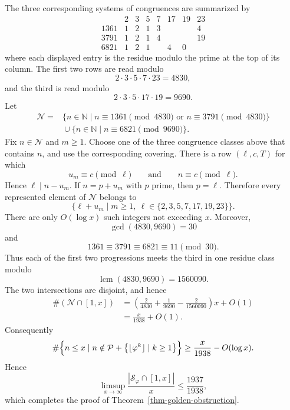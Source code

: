 \documentclass[11pt,reqno]{amsart}
\numberwithin{equation}{section}
\begin{document}
    The three corresponding systems of congruences are summarized by
    $$
    \begin{array}{c|ccccccc}
        & 2 & 3 & 5 & 7 & 17 & 19 & 23\\
        \hline
        1361 & 1 & 2 & 1 & 3 &   &   & 4\\
        3791 & 1 & 2 & 1 & 4 &   &   & 19\\
        6821 & 1 & 2 & 1 &   & 4 & 0 &
    \end{array}
    $$
    where each displayed entry is the residue modulo the prime at the top of its column. The first two rows are read modulo
    $$
    2\cdot3\cdot5\cdot7\cdot23=4830,
    $$
    and the third is read modulo
    $$
    2\cdot3\cdot5\cdot17\cdot19=9690.
    $$
    Let
    $$
    \begin{aligned}
        \mathcal{N}={}&\{n\in\mathbb{N}\mid n\equiv1361\pmod{4830}
        \text{ or }n\equiv3791\pmod{4830}\}\\
        &{}\cup\{n\in\mathbb{N}\mid n\equiv6821\pmod{9690}\}.
    \end{aligned}
    $$
    Fix $n\in\mathcal{N}$ and $m\ge1$. Choose one of the three congruence classes above that contains $n$, and use the corresponding covering. There is a row $(\ell,c,T)$ for which
    $$
    u_m\equiv c\pmod\ell
    \qquad\text{and}\qquad
    n\equiv c\pmod\ell.
    $$
    Hence $\ell\mid n-u_m$. If $n=p+u_m$ with $p$ prime, then $p=\ell$. Therefore every represented element of $\mathcal{N}$ belongs to
    $$
    \{\ell+u_m\mid m\ge1,\ \ell\in\{2,3,5,7,17,19,23\}\}.
    $$
    There are only $O(\log x)$ such integers not exceeding $x$. Moreover,
    $$
    \gcd(4830,9690)=30
    $$
    and
    $$
    1361\equiv3791\equiv6821\equiv11\pmod {30}.
    $$
    Thus each of the first two progressions meets the third in one residue class modulo
    $$
    \operatorname{lcm}(4830,9690)=1560090.
    $$
    The two intersections are disjoint, and hence
    $$
    \begin{aligned}
        \#(\mathcal{N}\cap[1,x])
        &=\left(\frac{2}{4830}+\frac{1}{9690}-\frac{2}{1560090}\right)x+O(1)\\
        &=\frac{x}{1938}+O(1).
    \end{aligned}
    $$
    Consequently
    $$
    \#\Bigl\{n\le x\mid n\notin \mathcal{P}+\bigl\{\lfloor \varphi^k\rfloor\mid k\ge1\bigr\}\Bigr\}
    \ge \frac{x}{1938}-O(\log x).
    $$
    Hence
    $$
    \limsup_{x\to\infty}
    \frac{\left|\mathcal{S}_\varphi\cap[1,x]\right|}{x}
    \le\frac{1937}{1938},
    $$
    which completes the proof of Theorem~\ref{thm-golden-obstruction}.
\end{document}
